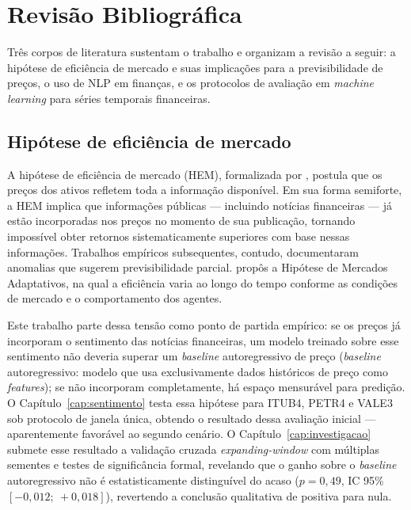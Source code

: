 \chapter{Revisão Bibliográfica}\label{cap:revisao}

Três corpos de literatura sustentam o trabalho e organizam a revisão a seguir: a hipótese de eficiência de mercado e suas implicações para a previsibilidade de preços, o uso de NLP em finanças, e os protocolos de avaliação em \textit{machine learning} para séries temporais financeiras.

\section{Hipótese de eficiência de mercado}

A hipótese de eficiência de mercado (HEM), formalizada por , postula que os preços dos ativos refletem toda a informação disponível. Em sua forma semiforte, a HEM implica que informações públicas --- incluindo notícias financeiras --- já estão incorporadas nos preços no momento de sua publicação, tornando impossível obter retornos sistematicamente superiores com base nessas informações. Trabalhos empíricos subsequentes, contudo, documentaram anomalias que sugerem previsibilidade parcial.  propôs a Hipótese de Mercados Adaptativos, na qual a eficiência varia ao longo do tempo conforme as condições de mercado e o comportamento dos agentes.

Este trabalho parte dessa tensão como ponto de partida empírico: se os preços já incorporam o sentimento das notícias financeiras, um modelo treinado sobre esse sentimento não deveria superar um \textit{baseline} autoregressivo de preço (\textit{baseline} autoregressivo: modelo que usa exclusivamente dados históricos de preço como \textit{features}); se não incorporam completamente, há espaço mensurável para predição. O Capítulo~\ref{cap:sentimento} testa essa hipótese para ITUB4, PETR4 e VALE3 sob protocolo de janela única, obtendo o resultado dessa avaliação inicial --- aparentemente favorável ao segundo cenário. O Capítulo~\ref{cap:investigacao} submete esse resultado a validação cruzada \textit{expanding-window} com múltiplas sementes e testes de significância formal, revelando que o ganho sobre o \textit{baseline} autoregressivo não é estatisticamente distinguível do acaso ($p = 0{,}49$, IC 95\% $[-0{,}012;\ +0{,}018]$), revertendo a conclusão qualitativa de positiva para nula.


